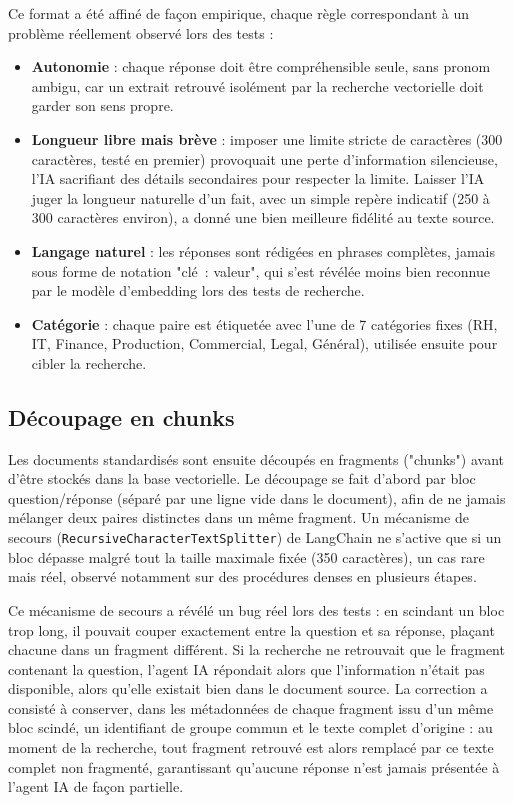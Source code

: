 \documentclass[12pt,a4paper]{report}
\begin{document}
Ce format a été affiné de façon empirique, chaque règle correspondant à
un problème réellement observé lors des tests :

\begin{itemize}
    \item \textbf{Autonomie} : chaque réponse doit être compréhensible
    seule, sans pronom ambigu, car un extrait retrouvé isolément par la
    recherche vectorielle doit garder son sens propre.
    \item \textbf{Longueur libre mais brève} : imposer une limite stricte
    de caractères (300 caractères, testé en premier) provoquait une perte
    d'information silencieuse, l'IA sacrifiant des détails secondaires
    pour respecter la limite. Laisser l'IA juger la longueur naturelle
    d'un fait, avec un simple repère indicatif (250 à 300 caractères
    environ), a donné une bien meilleure fidélité au texte source.
    \item \textbf{Langage naturel} : les réponses sont rédigées en
    phrases complètes, jamais sous forme de notation "clé~: valeur", qui
    s'est révélée moins bien reconnue par le modèle d'embedding lors des
    tests de recherche.
    \item \textbf{Catégorie} : chaque paire est étiquetée avec l'une de
    7 catégories fixes (RH, IT, Finance, Production, Commercial, Legal,
    Général), utilisée ensuite pour cibler la recherche.
\end{itemize}

\subsection{Découpage en chunks}

Les documents standardisés sont ensuite découpés en fragments
("chunks") avant d'être stockés dans la base vectorielle. Le découpage
se fait d'abord par bloc question/réponse (séparé par une ligne vide
dans le document), afin de ne jamais mélanger deux paires distinctes
dans un même fragment. Un mécanisme de secours
(\texttt{RecursiveCharacterTextSplitter}) de LangChain ne s'active que
si un bloc dépasse malgré tout la taille maximale fixée
(350 caractères), un cas rare mais réel, observé notamment sur des
procédures denses en plusieurs étapes.

Ce mécanisme de secours a révélé un bug réel lors des tests : en
scindant un bloc trop long, il pouvait couper exactement entre la
question et sa réponse, plaçant chacune dans un fragment différent. Si
la recherche ne retrouvait que le fragment contenant la question,
l'agent IA répondait alors que l'information n'était pas disponible,
alors qu'elle existait bien dans le document source. La correction a
consisté à conserver, dans les métadonnées de chaque fragment issu d'un
même bloc scindé, un identifiant de groupe commun et le texte complet
d'origine : au moment de la recherche, tout fragment retrouvé est alors
remplacé par ce texte complet non fragmenté, garantissant qu'aucune
réponse n'est jamais présentée à l'agent IA de façon partielle.
\end{document}
